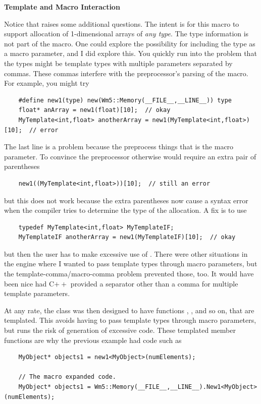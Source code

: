 \documentclass{article}
\begin{document}
\vspace*{0.1in}
{\bf Template and Macro Interaction}

Notice that  raises some additional questions.  The intent is for
this macro to support allocation of 1-dimensional arrays of {\em any type}.
The type information is not part of the macro.  One could explore the
possibility for including the type as a macro parameter, and I did explore
this.  You quickly run into the problem that the types might be template
types with multiple parameters separated by commas.  These commas interfere
with the preprocessor's parsing of the macro.  For example, you might try
\begin{verbatim}
    #define new1(type) new(Wm5::Memory(__FILE__,__LINE__)) type
    float* anArray = new1(float)[10];  // okay
    MyTemplate<int,float> anotherArray = new1(MyTemplate<int,float>)[10];  // error
\end{verbatim}
The last line is a problem because the preprocess things that
 is the macro parameter.  To convince the preprocessor otherwise
would require an extra pair of parentheses
\begin{verbatim}
    new1((MyTemplate<int,float>))[10];  // still an error
\end{verbatim}
but this does not work because the extra parentheses now cause a syntax
error when the compiler tries to determine the type of the allocation.  A fix is
to use
\begin{verbatim}
    typedef MyTemplate<int,float> MyTemplateIF;
    MyTemplateIF anotherArray = new1(MyTemplateIF)[10];  // okay
\end{verbatim}
but then the user has to make excessive use of .  There were
other situations in the engine where I wanted to pass template types through
macro parameters, but the template-comma/macro-comma problem prevented those,
too.  It would have been nice had C$++$ provided a separator other than a
comma for multiple template parameters.

At any rate, the  class was then designed to have functions
, , and so on, that are templated.  This avoids having
to pass template types through macro parameters, but runs the risk of generation
of excessive code.  These templated member functions are why the previous example
had code such as
\begin{verbatim}
    MyObject* objects1 = new1<MyObject>(numElements);
    
    // The macro expanded code.
    MyObject* objects1 = Wm5::Memory(__FILE__,__LINE__).New1<MyObject>(numElements);
\end{verbatim}
\end{document}
